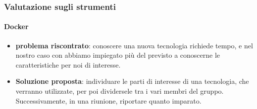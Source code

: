     \subsubsection{Valutazione sugli strumenti}
    
        \paragraph{Docker}
            \begin{itemize}
                \item \textbf{problema riscontrato}: conoscere una nuova tecnologia richiede tempo, e nel nostro caso con  abbiamo impiegato più del previsto a conoscerne le caratteristiche per noi di interesse.
                \item \textbf{Soluzione proposta}: individuare le parti di interesse di una tecnologia, che verranno utilizzate, per poi dividersele tra i vari membri del gruppo. Successivamente, in una riunione, riportare quanto imparato.
            \end{itemize}
    
    
		
		
		

